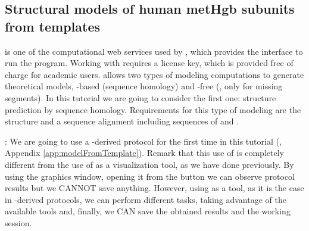 \subsection*{Structural models of human metHgb subunits from templates}

 \modeller \citep{sali1993} is one of the computational web services used by \chimera, which provides the interface to run the program. Working with \modeller requires a license key, which is provided free of charge for academic users. \modeller allows two types of modeling computations to generate theoretical models, -based (sequence homology) and -free (, only for missing segments). In this tutorial we are going to consider the first one: structure prediction by sequence homology. Requirements for this type of modeling are the  structure and a sequence alignment including sequences of  and . 
 
 : We are going to use a \chimera-derived protocol for the first time in this tutorial (, Appendix \ref{app:modelFromTemplate}). Remark that this use of \chimera is completely different from the use of \chimera as a visualization tool, as we have done previously. By using the \chimera graphics window, opening it from the \scipion button  we can observe protocol results but we CANNOT save anything. However, using \chimera as a tool, as it is the case in \scipion \chimera-derived protocols, we can perform different tasks, taking advantage of the available \chimera tools and, finally, we CAN save the obtained results and the working session.    
 
